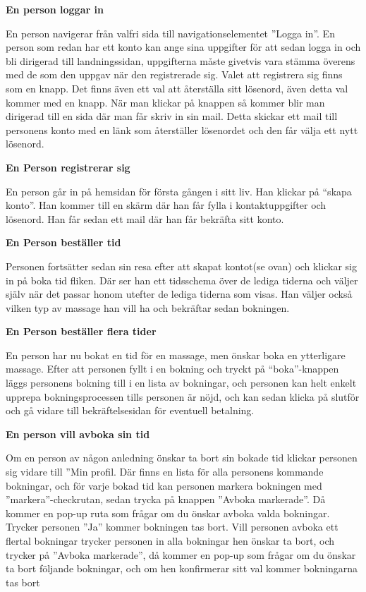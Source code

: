\documentclass[11pt, titlepage, oneside, a4paper]{article}	%
\begin{document}
\textbf {En person loggar in}

En person navigerar från valfri sida till navigationselementet ”Logga in”. En person som redan har ett konto kan ange sina uppgifter för att sedan logga in och bli dirigerad till landningssidan, uppgifterna måste givetvis vara stämma överens med de som den uppgav när den registrerade sig. Valet att registrera sig finns som en knapp. Det finns även ett val att återställa sitt lösenord, även detta val kommer med en knapp. När man klickar på knappen så kommer blir man dirigerad till en sida där man får skriv in sin mail. Detta skickar ett mail till personens konto med en länk som återställer lösenordet och den får välja ett nytt lösenord.

\textbf {En Person registrerar sig}

En person går in på hemsidan för första gången i sitt liv. Han klickar på “skapa konto”. Han kommer till en skärm där han får fylla i kontaktuppgifter och lösenord. Han får sedan ett mail där han får bekräfta sitt konto.

\textbf {En Person beställer tid}

Personen fortsätter sedan sin resa efter att skapat kontot(se ovan) och klickar sig in på boka tid fliken. Där ser han ett tidsschema över de lediga tiderna och väljer själv när det passar honom utefter de lediga tiderna som visas. Han väljer också vilken typ av massage han vill ha och bekräftar sedan bokningen.

\textbf {En Person beställer flera tider}

En person har nu bokat en tid för en massage, men önskar boka en ytterligare massage. Efter att personen fyllt i en bokning och tryckt på “boka”-knappen läggs personens bokning till i en lista av bokningar, och personen kan helt enkelt upprepa bokningsprocessen tills personen är nöjd, och kan sedan klicka på slutför och gå vidare till bekräftelsesidan för eventuell betalning.

\newpage
\textbf {En person vill avboka sin tid}

Om en person av någon anledning önskar ta bort sin bokade tid klickar personen sig vidare till ”Min profil. Där finns en lista för alla personens kommande bokningar, och för varje bokad tid kan personen markera bokningen med ”markera”-checkrutan, sedan trycka på knappen ”Avboka markerade”. Då kommer en pop-up ruta som frågar om du önskar avboka valda bokningar. Trycker personen ”Ja” kommer bokningen tas bort. Vill personen avboka ett flertal bokningar trycker personen in alla bokningar hen önskar ta bort, och trycker på ”Avboka markerade”, då kommer en pop-up som frågar om du önskar ta bort följande bokningar, och om hen konfirmerar sitt val kommer bokningarna tas bort
\end{document}
